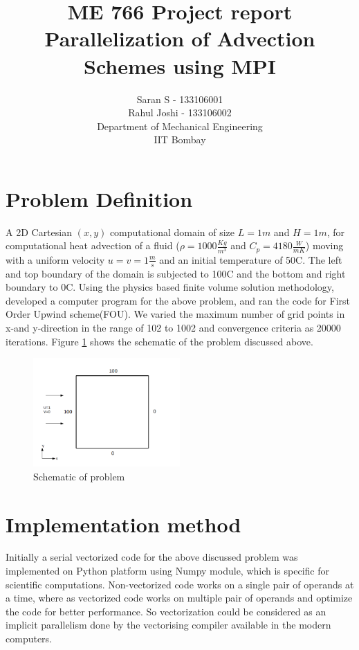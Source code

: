 \documentclass{report}
\author{Saran S - 133106001 \\ Rahul Joshi - 133106002 \\ Department of Mechanical Engineering \\ IIT Bombay}
\title{ME 766 Project report \\ Parallelization of Advection Schemes using MPI}
\begin{document}
\maketitle
\section*{Problem Definition}
A 2D Cartesian $(x,y)$ computational domain of size $L=1m$ and $H=1m$, for computational heat advection of a fluid ($\rho=1000\frac{Kg}{m^3}$ and $C_p=4180\frac{W}{mK}$) moving with a uniform velocity $u=v=1\frac{m}{s}$ and an initial temperature of 50C. The left and top boundary of the domain is subjected to 100C and the bottom and right boundary to 0C. Using the physics based finite volume solution methodology, developed a computer program for the above problem, and ran the code for First Order Upwind scheme(FOU). We varied the maximum number of grid points in x-and y-direction in the range of 102 to 1002 and convergence criteria as 20000 iterations. Figure \ref{fig:schematic} shows the schematic of the problem discussed above.
\begin{figure}[h]
\centering
\includegraphics[width=0.5\textwidth]{1}
\caption{Schematic of problem}
\label{fig:schematic}
\end{figure}

\section*{Implementation method}
Initially a serial vectorized code for the above discussed problem was implemented on Python platform using Numpy module, which is specific for scientific computations. Non-vectorized code works on a single pair of operands at a time, where as vectorized code works on multiple pair of operands and optimize the code for better performance. So vectorization could be considered as an implicit parallelism done by the vectorising compiler available in the modern computers. 
\end{document}
